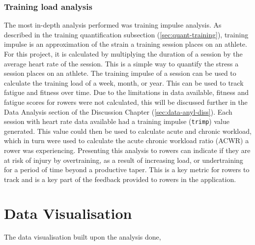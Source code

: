 \subsubsection{Training load analysis}
The most in-depth analysis performed was training impulse analysis. As described in the training quantification subsection (\autoref{sec:quant-training}), training impulse is an approximation of the strain a training session places on an athlete. For this project, it is calculated by multiplying the duration of a session by the average heart rate of the session. This is a simple way to quantify the stress a session places on an athlete. The training impulse of a session can be used to calculate the training load of a week, month, or year. This can be used to track fatigue and fitness over time. Due to the limitations in data available, fitness and fatigue scores for rowers were not calculated, this will be discussed further in the Data Analysis section of the Discussion Chapter (\ref{sec:data-anyl-diss}).
Each session with heart rate data available had a training impulse (\texttt{trimp}) value generated. This value could then be used to calculate acute and chronic workload, which in turn were used to calculate the acute chronic workload ratio (ACWR) a rower was experiencing. Presenting this analysis to rowers can indicate if they are at risk of injury by overtraining, as a result of increasing load, or undertraining for a period of time beyond a productive taper. This is a key metric for rowers to track and is a key part of the feedback provided to rowers in the application.

\section{\label{sec:data-viz}Data Visualisation}
The data visualisation built upon the analysis done, 
